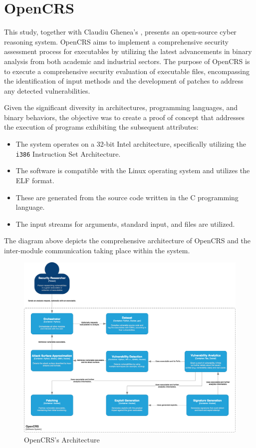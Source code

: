 \documentclass[../main.tex]{subfiles}
\begin{document}
\hypertarget{opencrs}{%
\chapter{OpenCRS}\label{opencrs}}

This study, together with Claudiu Ghenea's \cite{ghenea}, presents an open-source
cyber reasoning system. OpenCRS aims to implement a comprehensive
security assessment process for executables by utilizing the latest
advancements in binary analysis from both academic and industrial
sectors. The purpose of OpenCRS is to execute a comprehensive security
evaluation of executable files, encompassing the identification of input
methods and the development of patches to address any detected
vulnerabilities.

Given the significant diversity in architectures, programming languages,
and binary behaviors, the objective was to create a proof of concept
that addresses the execution of programs exhibiting the subsequent
attributes:

\begin{itemize}
\tightlist
\item
  The system operates on a 32-bit Intel architecture, specifically
  utilizing the \texttt{i386} Instruction Set Architecture.
\item
  The software is compatible with the Linux operating system and
  utilizes the ELF format.
\item
  These are generated from the source code written in the C programming
  language.
\item
  The input streams for arguments, standard input, and files are
  utilized.
\end{itemize}

The diagram above depicts the comprehensive architecture of OpenCRS and
the inter-module communication taking place within the system.

\begin{landscape}
\begin{figure}[!h]
   \centering
    \includegraphics[height=0.95\textheight]{images/opencrs.png}
    \caption{OpenCRS's Architecture}
    \label{fig:opencrs_architecture}
\end{figure}
\end{landscape}
\end{document}
